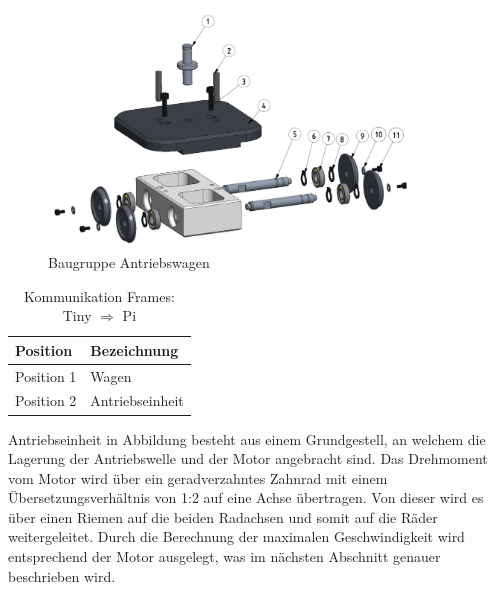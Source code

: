 \documentclass[../../main.tex]{subfiles}
\begin{document}
    \begin{figure}[H] %
        \centering
        \includegraphics[width=0.9\textwidth]{Fuehrungswagen.png}
        \caption{Baugruppe Antriebswagen}
        \label{fig:Antriebswagen}
    \end{figure} 

    \begin{table}[H] \centering
        \begin{tabular}{|l|l|}
        \hline
        \textbf{Position} & \textbf{Bezeichnung}\\
        \hline
        Position 1          & Wagen\\
         \hline
        Position 2          & Antriebseinheit\\
        \hline
    \end{tabular}
    
    \caption{Kommunikation Frames: Tiny $\Rightarrow$ Pi}
    \label{tab:com_tiny_pi}
    \end{table}

    Antriebseinheit in Abbildung besteht aus einem Grundgestell, an welchem die Lagerung der Antriebswelle und der Motor angebracht sind. Das Drehmoment vom Motor wird über ein geradverzahntes Zahnrad mit einem Übersetzungsverhältnis von 1:2 auf eine Achse übertragen. Von dieser wird es über einen Riemen auf die beiden Radachsen und somit auf die Räder weitergeleitet. Durch die Berechnung der maximalen Geschwindigkeit wird entsprechend der Motor ausgelegt, was im nächsten Abschnitt genauer beschrieben wird.
\end{document}
